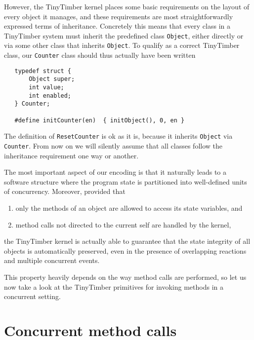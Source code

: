 \documentclass[12pt]{article}
\begin{document}
However, the TinyTimber kernel places some basic requirements on the layout of every object it manages, and these requirements are most straightforwardly expressed terms of inheritance.  Concretely this means that every class in a TinyTimber system must inherit the predefined class {\tt Object}, either directly or via some other class that inherits {\tt Object}.  To qualify as a correct TinyTimber class, our {\tt Counter} class should thus actually have been written
\begin{verbatim}
   typedef struct {
       Object super;
       int value;
       int enabled;
   } Counter;
   
   #define initCounter(en)  { initObject(), 0, en }
\end{verbatim}
The definition of {\tt ResetCounter} is ok as it is, because it inherits {\tt Object} via {\tt Counter}.  From now on we will silently assume that all classes follow the inheritance requirement one way or another.

The most important aspect of our encoding is that it naturally leads to a software structure where the program state is partitioned into well-defined units of concurrency.  Moreover, provided that
\begin{enumerate}
\item only the methods of an object are allowed to access its state variables, and
\item method calls not directed to the current self are handled by the kernel,
\end{enumerate}
the TinyTimber kernel is actually able to guarantee that the state integrity of all objects is automatically preserved, even in the presence of overlapping reactions and multiple concurrent events.

This property heavily depends on the way method calls are performed, so let us now take a look at the TinyTimber primitives for invoking methods in a concurrent setting.

\section{Concurrent method calls}
\label{sect:primitives}
\end{document}
